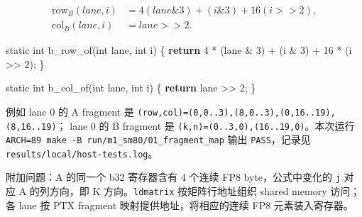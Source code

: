 \documentclass[11pt,a4paper,fontset=fandol]{ctexart}
\newenvironment{Shaded}{}{}
\newcommand{\AttributeTok}[1]{\textcolor[rgb]{0.49,0.56,0.16}{#1}}
\newcommand{\ControlFlowTok}[1]{\textcolor[rgb]{0.00,0.44,0.13}{\textbf{#1}}}
\newcommand{\DataTypeTok}[1]{\textcolor[rgb]{0.56,0.13,0.00}{#1}}
\newcommand{\DecValTok}[1]{\textcolor[rgb]{0.25,0.63,0.44}{#1}}
\newcommand{\NormalTok}[1]{#1}
\newcommand{\OperatorTok}[1]{\textcolor[rgb]{0.40,0.40,0.40}{#1}}
\begin{document}
\begin{answer}
\[
\begin{aligned}
\mathrm{row}_B(lane,i) &= 4(lane\mathbin{\&}3)+(i\mathbin{\&}3)+16(i\mathbin{>>}2),\\
\mathrm{col}_B(lane,i) &= lane\mathbin{>>}2.
\end{aligned}
\]

\begin{Shaded}
\begin{Highlighting}[]
\AttributeTok{static} \DataTypeTok{int}\NormalTok{ b\_row\_of}\OperatorTok{(}\DataTypeTok{int}\NormalTok{ lane}\OperatorTok{,} \DataTypeTok{int}\NormalTok{ i}\OperatorTok{)} \OperatorTok{\{}
    \ControlFlowTok{return} \DecValTok{4} \OperatorTok{*} \OperatorTok{(}\NormalTok{lane }\OperatorTok{\&} \DecValTok{3}\OperatorTok{)} \OperatorTok{+} \OperatorTok{(}\NormalTok{i }\OperatorTok{\&} \DecValTok{3}\OperatorTok{)} \OperatorTok{+} \DecValTok{16} \OperatorTok{*} \OperatorTok{(}\NormalTok{i }\OperatorTok{\textgreater{}\textgreater{}} \DecValTok{2}\OperatorTok{);}
\OperatorTok{\}}

\AttributeTok{static} \DataTypeTok{int}\NormalTok{ b\_col\_of}\OperatorTok{(}\DataTypeTok{int}\NormalTok{ lane}\OperatorTok{,} \DataTypeTok{int}\NormalTok{ i}\OperatorTok{)} \OperatorTok{\{}
    \ControlFlowTok{return}\NormalTok{ lane }\OperatorTok{\textgreater{}\textgreater{}} \DecValTok{2}\OperatorTok{;}
\OperatorTok{\}}
\end{Highlighting}
\end{Shaded}

例如 lane 0 的 A fragment 是
\texttt{(row,\allowbreak{}col)=\allowbreak{}(0,\allowbreak{}0.\allowbreak{}.\allowbreak{}3),\allowbreak{}(8,\allowbreak{}0.\allowbreak{}.\allowbreak{}3),\allowbreak{}(0,\allowbreak{}16.\allowbreak{}.\allowbreak{}19),\allowbreak{}(8,\allowbreak{}16.\allowbreak{}.\allowbreak{}19)}；
lane 0 的 B fragment 是
\texttt{(k,\allowbreak{}n)=\allowbreak{}(0.\allowbreak{}.\allowbreak{}3,\allowbreak{}0),\allowbreak{}(16.\allowbreak{}.\allowbreak{}19,\allowbreak{}0)}。本次运行
\texttt{ARCH=\allowbreak{}89\ make\ -\allowbreak{}B\ run/\allowbreak{}m1\_\allowbreak{}sm80/\allowbreak{}01\_\allowbreak{}fragment\_\allowbreak{}map}
输出 \texttt{PASS}，记录见
\texttt{results/\allowbreak{}local/\allowbreak{}host-\allowbreak{}tests.\allowbreak{}log}。

附加问题：A 的同一个 b32 寄存器含有 4 个连续 FP8 byte，公式中变化的
\texttt{j} 对应 A 的列方向，即 K 方向。\texttt{ldmatrix}
按矩阵行地址组织 shared memory 访问；各 lane 按 PTX fragment
映射提供地址，将相应的连续 FP8 元素装入寄存器。

\end{answer}
\end{document}
